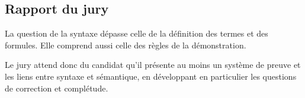 \documentclass[../../Agregation.tex]{subfiles}
\begin{document}

\subsection{Rapport du jury}

\begin{aquote}{}
La question de la syntaxe dépasse celle de la définition des termes et des formules. Elle comprend aussi celle des règles de la démonstration.

Le jury attend donc du candidat qu'il présente au moins un système de preuve et les liens entre syntaxe et sémantique, en développant en particulier les questions de correction et complétude.
\end{aquote}

\dvts
\end{document}
